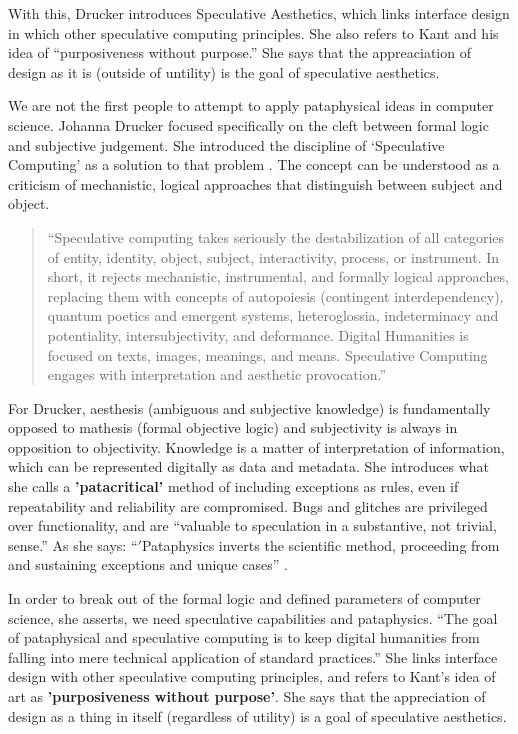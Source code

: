 With this, Drucker introduces Speculative Aesthetics, which links interface design in which other speculative computing principles. She also refers to Kant and his idea of ``purposiveness without purpose.'' She says that the appreaciation of design as it is (outside of untility) is the goal of speculative aesthetics.

We are not the first people to attempt to apply pataphysical ideas in computer science. Johanna Drucker focused specifically on the cleft between formal logic and subjective judgement. She introduced the discipline of `Speculative Computing' as a solution to that problem \autocite{Drucker2007}. The concept can be understood as a criticism of mechanistic, logical approaches that distinguish between subject and object.

\begin{quote}
  ``Speculative computing takes seriously the destabilization of all categories of entity, identity, object, subject, interactivity, process, or instrument. In short, it rejects mechanistic, instrumental, and formally logical approaches, replacing them with concepts of autopoiesis (contingent interdependency), quantum poetics and emergent systems, heteroglossia, indeterminacy and potentiality, intersubjectivity, and deformance. Digital Humanities is focused on texts, images, meanings, and means. Speculative Computing engages with interpretation and aesthetic provocation.'' \autocite[p.29]{Drucker2009}
\end{quote}

For Drucker, aesthesis (ambiguous and subjective knowledge) is fundamentally opposed to mathesis (formal objective logic) and subjectivity is always in opposition to objectivity. Knowledge is a matter of interpretation of information, which can be represented digitally as data and metadata. She introduces what she calls a \textbf{'patacritical'} method of including exceptions as rules, even if repeatability and reliability are compromised. Bugs and glitches are privileged over functionality, and are ``valuable to speculation in a substantive, not trivial, sense.'' As she says: ``$'$Pataphysics inverts the scientific method, proceeding from and sustaining exceptions and unique cases'' \autocite{Drucker2007}.

In order to break out of the formal logic and defined parameters of computer science, she asserts, we need speculative capabilities and pataphysics. ``The goal of pataphysical and speculative computing is to keep digital humanities from falling into mere technical application of standard practices.'' She links interface design with other speculative computing principles, and refers to Kant's idea of art as \textbf{'purposiveness without purpose'}. She says that the appreciation of design as a thing in itself (regardless of utility) is a goal of speculative aesthetics.

